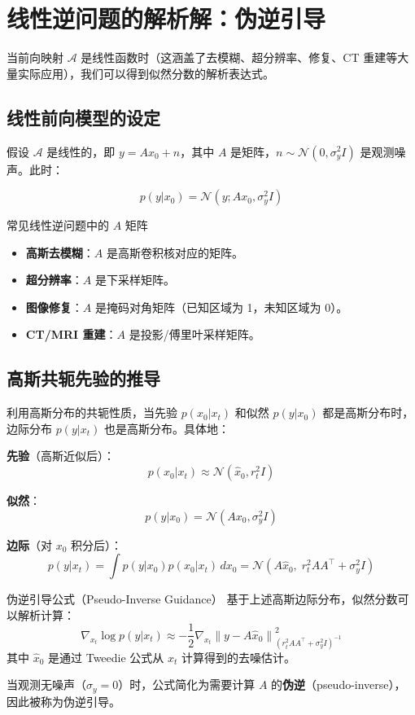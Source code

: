 \section{线性逆问题的解析解：伪逆引导}

当前向映射 $\mathcal{A}$ 是线性函数时（这涵盖了去模糊、超分辨率、修复、CT 重建等大量实际应用），我们可以得到似然分数的解析表达式。

\subsection{线性前向模型的设定}

假设 $\mathcal{A}$ 是线性的，即 $y = A x_0 + n$，其中 $A$ 是矩阵，$n \sim \mathcal{N}(0, \sigma_y^2 I)$ 是观测噪声。此时：

$$
p(y | x_0) = \mathcal{N}(y; A x_0, \sigma_y^2 I)
$$

\begin{knowledgebox}{常见线性逆问题中的 $A$ 矩阵}
\begin{itemize}
    \item \textbf{高斯去模糊}：$A$ 是高斯卷积核对应的矩阵。
    \item \textbf{超分辨率}：$A$ 是下采样矩阵。
    \item \textbf{图像修复}：$A$ 是掩码对角矩阵（已知区域为 1，未知区域为 0）。
    \item \textbf{CT/MRI 重建}：$A$ 是投影/傅里叶采样矩阵。
\end{itemize}
\end{knowledgebox}

\subsection{高斯共轭先验的推导}

利用高斯分布的共轭性质，当先验 $p(x_0 | x_t)$ 和似然 $p(y|x_0)$ 都是高斯分布时，边际分布 $p(y | x_t)$ 也是高斯分布。具体地：

\textbf{先验}（高斯近似后）：
$$
p(x_0 | x_t) \approx \mathcal{N}(\hat{x}_0, r_t^2 I)
$$

\textbf{似然}：
$$
p(y | x_0) = \mathcal{N}(A x_0, \sigma_y^2 I)
$$

\textbf{边际}（对 $x_0$ 积分后）：
$$
p(y | x_t) = \int p(y | x_0) p(x_0 | x_t) \, dx_0 = \mathcal{N}(A \hat{x}_0, \; r_t^2 A A^\top + \sigma_y^2 I)
$$

\begin{importantbox}{伪逆引导公式（Pseudo-Inverse Guidance）}
基于上述高斯边际分布，似然分数可以解析计算：
$$
\nabla_{x_t} \log p(y | x_t) \approx -\frac{1}{2} \nabla_{x_t} \left\| y - A \hat{x}_0 \right\|^2_{(r_t^2 A A^\top + \sigma_y^2 I)^{-1}}
$$
其中 $\hat{x}_0$ 是通过 Tweedie 公式从 $x_t$ 计算得到的去噪估计。

当观测无噪声（$\sigma_y = 0$）时，公式简化为需要计算 $A$ 的\textbf{伪逆}（pseudo-inverse），因此被称为伪逆引导。
\end{importantbox}


